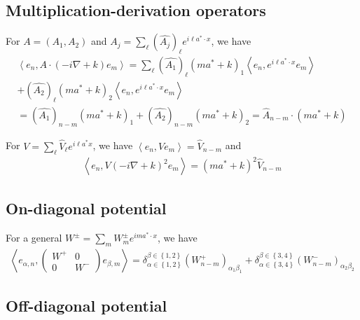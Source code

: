 \documentclass[11pt,a4paper,reqno,french,tikz]{amsart}
\newcommand{\pa}[1]{\left( #1 \right)} %
\newcommand{\acs}[1]{\left\{ #1 \right\}} %
\newcommand{\ps}[1]{\left< #1 \right>} %
\newcommand{\na}{\nabla} %
\newcommand{\mat}[1]{\begin{pmatrix} #1 \end{pmatrix}} %
\begin{document}
\subsection{Multiplication-derivation operators}%

For $A = (A_1,A_2)$ and $A_j = \sum_\ell \pa{\widehat{A_j}}_\ell e^{i \ell a^*\cdot x}$, we have
\begin{multline*}
\ps{e_n, A \cdot (-i\na +k) e_m} = \sum_{\ell} \pa{\widehat{A_1}}_\ell \pa{ma^* + k}_1\ps{e_n, e^{i\ell a^*\cdot x} e_m} \\
+ \pa{\widehat{A_2}}_\ell \pa{ma^* + k}_2\ps{e_n, e^{i\ell a^*\cdot x} e_m} \\
= \pa{\widehat{A_1}}_{n-m} \pa{ma^* + k}_1 + \pa{\widehat{A_2}}_{n-m} \pa{ma^* + k}_2 = \widehat{A}_{n-m} \cdot \pa{ma^*+k}
\end{multline*}

For $V = \sum_\ell \widehat{V}_\ell e^{i\ell a^*x}$, we have $\ps{e_n,V e_m} = \widehat{V}_{n-m}$ and
\begin{align*}
\ps{e_n,V (-i\na + k)^2 e_m} =  \pa{ma^*+k}^2\widehat{V}_{n-m}
\end{align*}
\subsection{On-diagonal potential}%
\label{sub:on_diagonal_potential}



For a general $W^\pm = \sum_m W^\pm_m e^{im a^* \cdot x}$, we have
\begin{align*}
	\ps{e_{\alpha,n},\mat{W^+ & 0 \\ 0 & W^-} e_{\beta,m}} = \delta_{\alpha \in \acs{1,2}}^{\beta \in \acs{1,2}}\pa{W^+_{n-m}}_{\alpha_1 \beta_1} + \delta_{\alpha \in \acs{3,4}}^{\beta \in \acs{3,4}}\pa{W^-_{n-m}}_{\alpha_2 \beta_2}
\end{align*}

\subsection{Off-diagonal potential}%
\label{sub:off_diagonal_potential}
\end{document}
